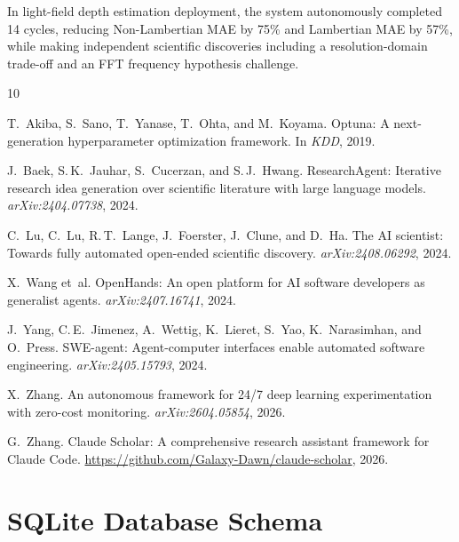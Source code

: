 \documentclass[11pt,a4paper]{article}
\begin{document}
In light-field depth estimation deployment, the system autonomously completed 14 cycles, reducing Non-Lambertian MAE by 75\% and Lambertian MAE by 57\%, while making independent scientific discoveries including a resolution-domain trade-off and an FFT frequency hypothesis challenge.



\begin{thebibliography}{10}

T.~Akiba, S.~Sano, T.~Yanase, T.~Ohta, and M.~Koyama.
\newblock Optuna: A next-generation hyperparameter optimization framework.
\newblock In \emph{KDD}, 2019.

J.~Baek, S.\,K.~Jauhar, S.~Cucerzan, and S.\,J.~Hwang.
\newblock ResearchAgent: Iterative research idea generation over scientific literature with large language models.
\newblock \emph{arXiv:2404.07738}, 2024.

C.~Lu, C.~Lu, R.\,T.~Lange, J.~Foerster, J.~Clune, and D.~Ha.
\newblock The AI scientist: Towards fully automated open-ended scientific discovery.
\newblock \emph{arXiv:2408.06292}, 2024.

X.~Wang et~al.
\newblock OpenHands: An open platform for AI software developers as generalist agents.
\newblock \emph{arXiv:2407.16741}, 2024.

J.~Yang, C.\,E.~Jimenez, A.~Wettig, K.~Lieret, S.~Yao, K.~Narasimhan, and O.~Press.
\newblock SWE-agent: Agent-computer interfaces enable automated software engineering.
\newblock \emph{arXiv:2405.15793}, 2024.

X.~Zhang.
\newblock An autonomous framework for 24/7 deep learning experimentation with zero-cost monitoring.
\newblock \emph{arXiv:2604.05854}, 2026.

G.~Zhang.
\newblock Claude Scholar: A comprehensive research assistant framework for Claude Code.
\newblock \url{https://github.com/Galaxy-Dawn/claude-scholar}, 2026.

\end{thebibliography}


\appendix

\section{SQLite Database Schema}
\end{document}
